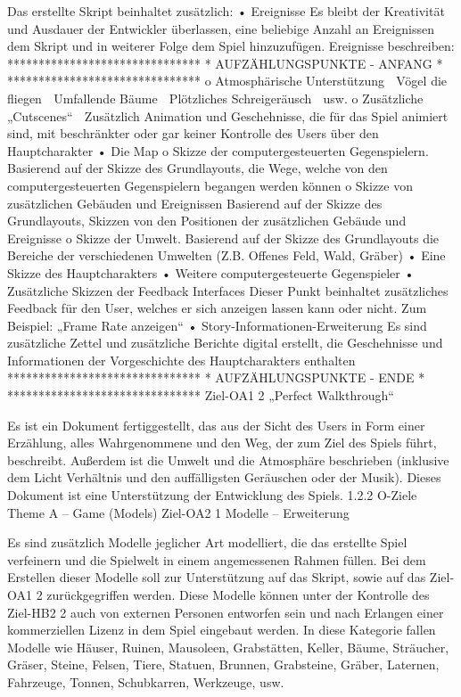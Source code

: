 		Das erstellte Skript beinhaltet zusätzlich:
•	Ereignisse
Es bleibt der Kreativität und Ausdauer der Entwickler überlassen, eine beliebige Anzahl an Ereignissen dem Skript und in weiterer Folge dem Spiel hinzuzufügen.
Ereignisse beschreiben:
		 *******************************
		 *  AUFZÄHLUNGSPUNKTE - ANFANG *
		 *******************************
o	Atmosphärische Unterstützung
	Vögel die fliegen
	Umfallende Bäume
	Plötzliches Schreigeräusch
	usw.
o	Zusätzliche „Cutscenes“
	Zusätzlich Animation und Geschehnisse, die für das Spiel animiert sind, mit beschränkter oder gar keiner Kontrolle des Users über den Hauptcharakter
•	Die Map
o	Skizze der computergesteuerten Gegenspielern.
Basierend auf der Skizze des Grundlayouts, die Wege, welche von den computergesteuerten Gegenspielern begangen werden können
o	Skizze von zusätzlichen Gebäuden und Ereignissen
Basierend auf der Skizze des Grundlayouts, Skizzen von den Positionen der zusätzlichen Gebäude und Ereignisse
o	Skizze der Umwelt.
Basierend auf der Skizze des Grundlayouts die Bereiche der verschiedenen Umwelten (Z.B. Offenes Feld, Wald, Gräber)
•	Eine Skizze des Hauptcharakters
•	Weitere computergesteuerte Gegenspieler
•	Zusätzliche Skizzen der Feedback Interfaces
Dieser Punkt beinhaltet zusätzliches Feedback für den User, welches er sich anzeigen lassen kann oder nicht.
Zum Beispiel: „Frame Rate anzeigen“
•	Story-Informationen-Erweiterung
Es sind zusätzliche Zettel und zusätzliche Berichte digital erstellt, die Geschehnisse und Informationen der Vorgeschichte des Hauptcharakters enthalten
		 *******************************
		 *  AUFZÄHLUNGSPUNKTE - ENDE   *
		 *******************************
Ziel-OA1 2 	„Perfect Walkthrough“

Es ist ein Dokument fertiggestellt, das aus der Sicht des Users in Form einer Erzählung, alles Wahrgenommene und den Weg, der zum Ziel des Spiels führt, beschreibt. Außerdem ist die Umwelt und die Atmosphäre beschrieben (inklusive dem Licht Verhältnis und den auffälligsten Geräuschen oder der Musik).
Dieses Dokument ist eine Unterstützung der Entwicklung des Spiels.
1.2.2	O-Ziele Theme A – Game (Models)
Ziel-OA2 1	Modelle – Erweiterung

Es sind zusätzlich Modelle jeglicher Art modelliert, die das erstellte Spiel verfeinern und die Spielwelt in einem angemessenen Rahmen füllen. Bei dem Erstellen dieser Modelle soll zur Unterstützung auf das Skript, sowie auf das Ziel-OA1 2 zurückgegriffen werden. Diese Modelle können unter der Kontrolle des Ziel-HB2 2 auch von externen Personen entworfen sein und nach Erlangen einer kommerziellen Lizenz in dem Spiel eingebaut werden. In diese Kategorie fallen Modelle wie Häuser, Ruinen, Mausoleen, Grabstätten, Keller, Bäume, Sträucher, Gräser, Steine, Felsen, Tiere, Statuen, Brunnen, Grabsteine, Gräber, Laternen, Fahrzeuge, Tonnen, Schubkarren, Werkzeuge, usw.


